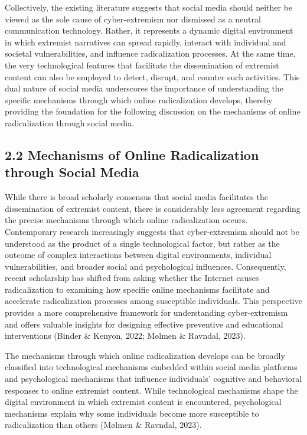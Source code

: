 \documentclass[10pt]{NSP1}
\begin{document}
	Collectively, the existing literature suggests that social media should neither be viewed as the sole cause of cyber-extremism nor dismissed as a neutral communication technology. Rather, it represents a dynamic digital environment in which extremist narratives can spread rapidly, interact with individual and societal vulnerabilities, and influence radicalization processes. At the same time, the very technological features that facilitate the dissemination of extremist content can also be employed to detect, disrupt, and counter such activities. This dual nature of social media underscores the importance of understanding the specific mechanisms through which online radicalization develops, thereby providing the foundation for the following discussion on the mechanisms of online radicalization through social media.
	
	\subsection*{2.2 Mechanisms of Online Radicalization through Social Media}
	
	While there is broad scholarly consensus that social media facilitates the dissemination of extremist content, there is considerably less agreement regarding the precise mechanisms through which online radicalization occurs. Contemporary research increasingly suggests that cyber-extremism should not be understood as the product of a single technological factor, but rather as the outcome of complex interactions between digital environments, individual vulnerabilities, and broader social and psychological influences. Consequently, recent scholarship has shifted from asking whether the Internet causes radicalization to examining how specific online mechanisms facilitate and accelerate radicalization processes among susceptible individuals. This perspective provides a more comprehensive framework for understanding cyber-extremism and offers valuable insights for designing effective preventive and educational interventions (Binder \& Kenyon, 2022; M\o lmen \& Ravndal, 2023).
	
	The mechanisms through which online radicalization develops can be broadly classified into technological mechanisms embedded within social media platforms and psychological mechanisms that influence individuals' cognitive and behavioral responses to online extremist content. While technological mechanisms shape the digital environment in which extremist content is encountered, psychological mechanisms explain why some individuals become more susceptible to radicalization than others (M\o lmen \& Ravndal, 2023).
	
\end{document}
